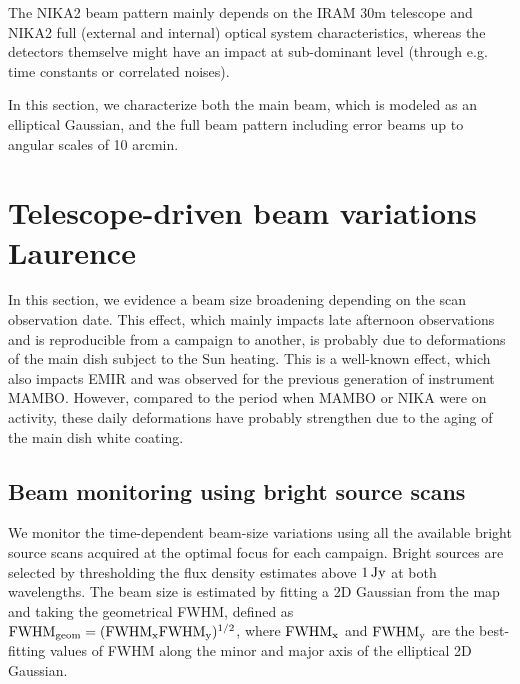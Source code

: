 

The NIKA2 beam pattern mainly depends on the IRAM 30m telescope and
NIKA2 full (external and internal) optical system characteristics,
whereas the detectors themselve might have an impact at sub-dominant
level (through e.g. time constants or correlated noises).

In this section, we characterize both the main beam, which is
modeled as an elliptical Gaussian, and the full beam pattern including
error beams up to angular scales of 10 arcmin.

\section{Telescope-driven beam variations {\color{YellowGreen} Laurence}}
\label{se:obsdate_variations}

In this section, we evidence a beam size broadening depending on the
scan observation date. This effect, which mainly impacts late
afternoon observations and is reproducible from a campaign to another,
is probably due to deformations of the main dish subject to the Sun
heating. This is a well-known effect, which also impacts EMIR and was
observed for the previous generation of instrument MAMBO. However,
compared to the period when MAMBO or NIKA were on activity, these
daily deformations have probably strengthen due to the aging of the
main dish white coating.

\subsection{Beam monitoring using bright source scans}
\label{se:beam_monitoring_otf}

We monitor the time-dependent beam-size variations using all the
available bright source scans acquired at the optimal focus for each
campaign. Bright sources are selected by thresholding the flux density
estimates above $1\,\rm{Jy}$ at both wavelengths.
The beam size is estimated by fitting a 2D Gaussian from the map and
taking the geometrical FWHM, defined as 
$\rm{FWHM}_{\rm{geom}} = (\rm{FWHM}_x \rm{FWHM}_y)^{1/2}$, where
$\rm{FWHM}_x$ and $\rm{FWHM}_y$ are the best-fitting values of FWHM
along the minor and major axis of the elliptical 2D Gaussian.

